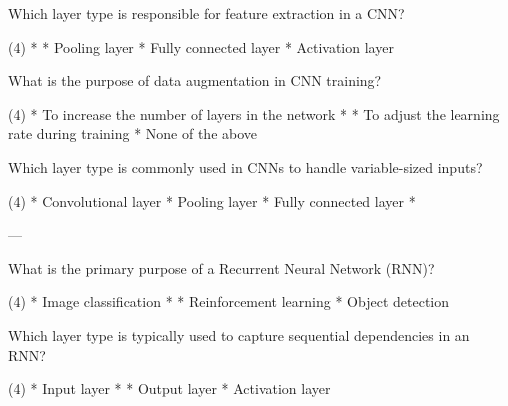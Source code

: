\documentclass[10pt]{extarticle}
\begin{document}
\begin{exercise}
    Which layer type is responsible for feature extraction in a CNN?
    \begin{choice} (4)
        * 
        * Pooling layer
        * Fully connected layer
        * Activation layer
    \end{choice}
\end{exercise}
\begin{solution}
\end{solution}

\begin{exercise}
    What is the purpose of data augmentation in CNN training?
    \begin{choice} (4)
        * To increase the number of layers in the network
        * 
        * To adjust the learning rate during training
        * None of the above
    \end{choice}
\end{exercise}
\begin{solution}
\end{solution}

\begin{exercise}
    Which layer type is commonly used in CNNs to handle variable-sized inputs?
    \begin{choice} (4)
        * Convolutional layer
        * Pooling layer
        * Fully connected layer
        * 
    \end{choice}
\end{exercise}
\begin{solution}
\end{solution}


---

\begin{exercise}
    What is the primary purpose of a Recurrent Neural Network (RNN)?
    \begin{choice} (4)
        * Image classification
        * 
        * Reinforcement learning
        * Object detection
    \end{choice}
\end{exercise}
\begin{solution}
\end{solution}

\begin{exercise}
    Which layer type is typically used to capture sequential dependencies in an RNN?
    \begin{choice} (4)
        * Input layer
        * 
        * Output layer
        * Activation layer
    \end{choice}
\end{exercise}
\begin{solution}
\end{solution}
\end{document}
